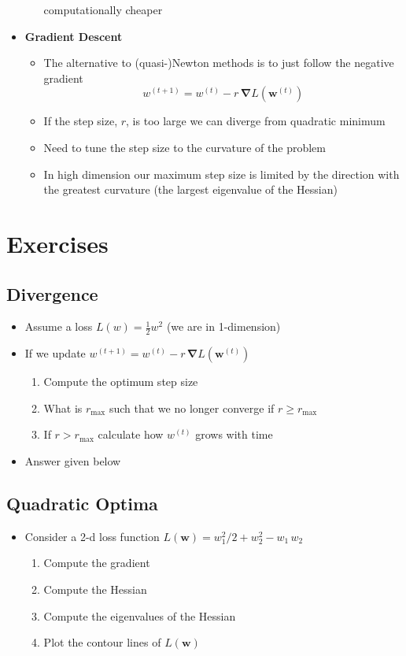 \documentclass[11pt]{article}
\newcommand{\grad}{\bm{\nabla}}
\begin{document}
\begin{itemize}
\begin{itemize}
computationally cheaper
\end{itemize}
\item \textbf{Gradient Descent}
\begin{itemize}
\item The alternative to (quasi-)Newton methods is to just follow the
negative gradient 
$$ w^{(t+1)} = w^{(t)} - r\,\grad L(\bm{w}^{(t)}) $$
\item If the step size, \(r\), is too large we can diverge from quadratic minimum
\item Need to tune the step size to the curvature of the problem
\item In high dimension our maximum step size is limited by the
direction with the greatest curvature (the largest eigenvalue
of the Hessian)
\end{itemize}
\end{itemize}

\section{Exercises}
\label{sec:orgc1a7b08}

\subsection{Divergence}
\label{sec:org6e1e58c}
\begin{itemize}
\item Assume a loss \(L(w) = \tfrac{1}{2} w^2\) (we are in 1-dimension)
\item If we update \(w^{(t+1)} = w^{(t)} - r\,\grad L(\bm{w}^{(t)})\)
\begin{enumerate}
\item Compute the optimum step size
\item What is \(r_{\max}\) such that we no longer converge if \(r\geq r_{\max}\)
\item If \(r>r_{\max}\) calculate how \(w^{(t)}\) grows with time
\end{enumerate}
\item Answer given below
\end{itemize}

\subsection{Quadratic Optima}
\label{sec:orga95ec0c}
\begin{itemize}
\item Consider a 2-d loss function \(L(\bm{w}) = w_1^2/2 + w_2^2 -w_1\,w_2\)
\begin{enumerate}
\item Compute the gradient
\item Compute the Hessian
\item Compute the eigenvalues of the Hessian
\item Plot the contour lines of \(L(\bm{w})\)
\end{enumerate}
\end{itemize}
\end{document}
